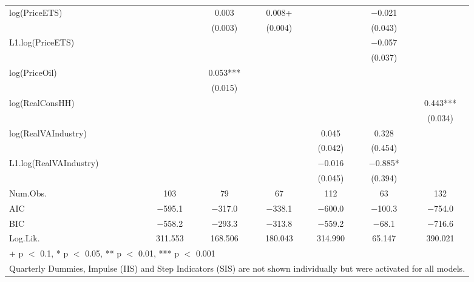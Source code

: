 \begin{table}
{\begin{tabular}[t]{lcccccc}
log(PriceETS) &  & \num{0.003} & \num{0.008}+ &  & \num{-0.021} & \\
 &  & (\num{0.003}) & (\num{0.004}) &  & (\num{0.043}) & \\
L1.log(PriceETS) &  &  &  &  & \num{-0.057} & \\
 &  &  &  &  & (\num{0.037}) & \\
log(PriceOil) &  & \num{0.053}*** &  &  &  & \\
 &  & (\num{0.015}) &  &  &  & \\
log(RealConsHH) &  &  &  &  &  & \num{0.443}***\\
 &  &  &  &  &  & (\num{0.034})\\
log(RealVAIndustry) &  &  &  & \num{0.045} & \num{0.328} & \\
 &  &  &  & (\num{0.042}) & (\num{0.454}) & \\
L1.log(RealVAIndustry) &  &  &  & \num{-0.016} & \num{-0.885}* & \\
 &  &  &  & (\num{0.045}) & (\num{0.394}) & \\
\midrule
Num.Obs. & \num{103} & \num{79} & \num{67} & \num{112} & \num{63} & \num{132}\\
AIC & \num{-595.1} & \num{-317.0} & \num{-338.1} & \num{-600.0} & \num{-100.3} & \num{-754.0}\\
BIC & \num{-558.2} & \num{-293.3} & \num{-313.8} & \num{-559.2} & \num{-68.1} & \num{-716.6}\\
Log.Lik. & \num{311.553} & \num{168.506} & \num{180.043} & \num{314.990} & \num{65.147} & \num{390.021}\\
\bottomrule
\multicolumn{7}{l}{\rule{0pt}{1em}+ p $<$ 0.1, * p $<$ 0.05, ** p $<$ 0.01, *** p $<$ 0.001}\\
\multicolumn{7}{l}{\rule{0pt}{1em}Quarterly Dummies, Impulse (IIS) and Step Indicators (SIS) are not shown individually but were activated for all models.}\\
\end{tabular}}
\end{table}

